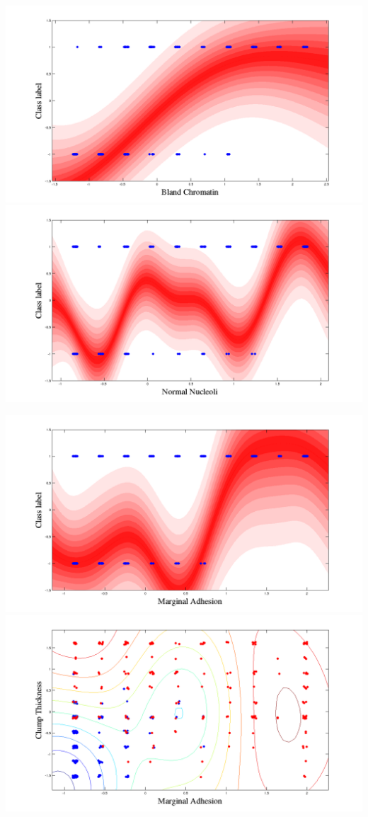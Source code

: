 

\begin{center}

\includegraphics[trim=0cm 0cm 0cm 0cm, width=1\textwidth]{figures/breast/chromatin.png} %
\includegraphics[trim=0cm 0cm 0cm 0cm, width=1\textwidth]{figures/breast/nucleoli.png} %

\includegraphics[trim=0cm 0cm 0cm 0cm, width=1\textwidth]{figures/breast/adhesion.png} %
\includegraphics[trim=0cm 0cm 0cm 0cm, width=1\textwidth]{figures/breast/clumpadhesion.png} %

\end{center}
